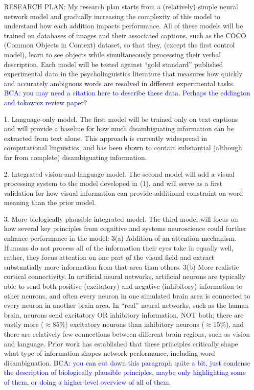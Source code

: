 \documentclass[letterpaper, 12pt]{article}
\newcommand{\bca}[1]{\textcolor{blue}{BCA: #1}} %
\begin{document}
RESEARCH PLAN: My research plan starts from a (relatively) simple neural network model and gradually increasing the complexity of this model to understand how each addition impacts performance.  All of these models will be trained on databases of images and their associated captions, such as the COCO (Common Objects in Context) dataset, so that they, (except the first control model), learn to see objects while simultaneously processing their verbal description. Each model will be tested against ``gold standard'' published experimental data in the psycholinguistics literature that measures how quickly and accurately ambiguous words are resolved in different experimental tasks.  \bca{you may need a citation here to describe these data.  Perhaps the eddington and tokowicz review paper?}

1.  Language-only model. The first model will be trained only on text captions and will provide a baseline for how much disambiguating information can be extracted from text alone.  This approach is currently widespread in computational linguistics, and has been shown to contain substantial (although far from complete) disambiguating information. \citep{beekhuizenWhatCompanySemantically2018}

2.  Integrated vision-and-language model.  The second model will add a visual processing system to the model developed in (1), and will serve as a first validation for how visual information can provide additional constraint on word meaning than the prior model.

3.  More biologically plausible integrated model.  The third model will focus on how several key principles from cognitive and systems neuroscience could further enhance performance in the model: 3(a) Addition of an attention mechanism. Humans do not process all of the information their eyes take in equally well, rather, they focus attention on one part of the visual field and extract substantially more information from that area than others. 3(b) More realistic cortical connectivity.  In artificial neural networks, artificial neurons are typically able to send both positive (excitatory) and negative (inhibitory) information to other neurons, and often every neuron in one simulated brain area is connected to every neuron in another brain area.  In ``real'' neural networks, such as the human brain, neurons send excitatory OR inhibitory information, NOT both; there are vastly more ($\approx85\%$) excitatory neurons than inhibitory neurons ($\approx15\%$), and there are relatively few connections between different brain regions, such as vision and language. Prior work \citep{laszloPSPsERPsApplying2014, Armstrong2016Disparatesemanticambiguity} has established that these principles critically shape what type of information shapes network performance, including word disambiguation.  \bca{you can cut down this paragraph quite a bit, just condense the description of biologically plausible principles, maybe only highlighting some of them, or doing a higher-level overview of all of them}.   
\end{document}
